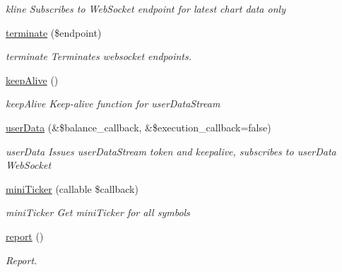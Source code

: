 \begin{DoxyCompactItemize}
\begin{DoxyCompactList}\small\item\em kline Subscribes to  Web\-Socket endpoint for latest chart data only \end{DoxyCompactList}\item 
\hyperlink{classBinance_1_1API_a67ed560d60527ad64f16253069cb1b14}{terminate} (\$endpoint)
\begin{DoxyCompactList}\small\item\em terminate Terminates websocket endpoints. \end{DoxyCompactList}\item 
\hyperlink{classBinance_1_1API_a2a29ca9ab18d04ff2e42aa6e5e0ce312}{keep\-Alive} ()
\begin{DoxyCompactList}\small\item\em keep\-Alive Keep-\/alive function for user\-Data\-Stream \end{DoxyCompactList}\item 
\hyperlink{classBinance_1_1API_af033a40a6a86ad422c58d67dc57bb0fd}{user\-Data} (\&\$balance\-\_\-callback, \&\$execution\-\_\-callback=false)
\begin{DoxyCompactList}\small\item\em user\-Data Issues user\-Data\-Stream token and keepalive, subscribes to user\-Data Web\-Socket \end{DoxyCompactList}\item 
\hyperlink{classBinance_1_1API_af115a75377eb89f33d7beb488f5bb7c5}{mini\-Ticker} (callable \$callback)
\begin{DoxyCompactList}\small\item\em mini\-Ticker Get mini\-Ticker for all symbols \end{DoxyCompactList}\item 
\hyperlink{classBinance_1_1API_adf90d773a5fdbb8a4ca0c712a78f2b97}{report} ()
\begin{DoxyCompactList}\small\item\em Report. \end{DoxyCompactList}\end{DoxyCompactItemize}

